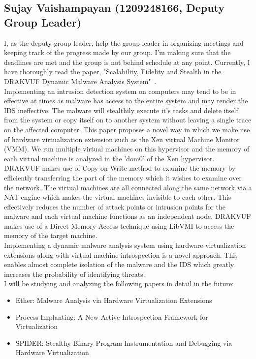\documentclass[11pt]{article}
\begin{document}
		\subsection{Sujay Vaishampayan (1209248166, Deputy Group Leader)}
		I, as the deputy group leader, help the group leader in organizing meetings and keeping track of the progress made by our group. I'm making sure that the deadlines are met and the group is not behind schedule at any point. Currently, I have thoroughly read the paper, "Scalability, Fidelity and Stealth in the DRAKVUF Dynamic Malware Analysis System"~\cite{lengyel2014scalability}. \\
		Implementing an intrusion detection system on computers may tend to be in effective at times as malware has access to the entire system and may render the IDS ineffective. The malware will stealthily execute it's tasks and delete itself from the system or copy itself on to another system without leaving a single trace on the affected computer. This paper proposes a novel way in which we make use of hardware virtualization extension such as the Xen virtual Machine Monitor (VMM). We run multiple virtual machines on this hypervisor and the memory of each virtual machine is analyzed in the 'dom0' of the Xen hypervisor. DRAKVUF makes use of Copy-on-Write method to examine the memory by efficiently transferring the part of the memory which it wishes to examine over the network. The virtual machines are all connected along the same network via a NAT engine which makes the virtual machines invisible to each other. This effectively reduces the number of attack points or intrusion points for the malware and each virtual machine functions as an independent node. DRAKVUF makes use of a Direct Memory Access technique using LibVMI to access the memory of the target machine.\\ 
		Implementing a dynamic malware analysis system using hardware virtualization extensions along with virtual machine introspection is a novel approach. This enables almost complete isolation of the malware and the IDS which greatly increases the probability of identifying threats.\\
		I will be studying and analyzing the following papers in detail in the future:
		\begin{itemize}[noitemsep]
			\item Ether: Malware Analysis via Hardware Virtualization Extensions~\cite{dinaburg2008ether}
			\item Process Implanting: A New Active Introspection Framework for Virtualization~\cite{jiang2011procimplant}
			\item SPIDER: Stealthy Binary Program Instrumentation and Debugging via Hardware Virtualization~\cite{dongyan2013spider}
		\end{itemize}		
		
\end{document}
